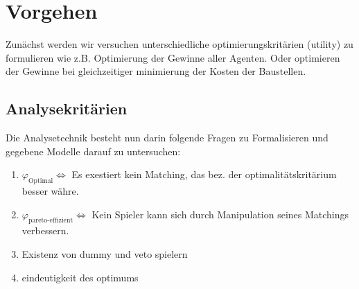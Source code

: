 \documentclass[12pt]{article}
\theoremstyle{break}
\begin{document}
\section{Vorgehen}
Zunächst werden wir versuchen unterschiedliche optimierungskritärien (utility) zu formulieren wie z.B. Optimierung der Gewinne aller Agenten. Oder optimieren der Gewinne bei gleichzeitiger minimierung der Kosten der Baustellen.


\subsection*{Analysekritärien}
Die Analysetechnik besteht nun darin folgende Fragen zu Formalisieren und gegebene Modelle darauf zu untersuchen:

\begin{enumerate}
  \item $\varphi_{\text{Optimal}}\Leftrightarrow$ Es exestiert kein Matching, das bez. der optimalitätskritärium besser währe.
  \item $\varphi_{\text{pareto-effizient}}\Leftrightarrow$ Kein Spieler kann sich durch Manipulation seines Matchings verbessern.
  \item Existenz von dummy und veto spielern
  \item eindeutigkeit des optimums
\end{enumerate}

\end{document}
